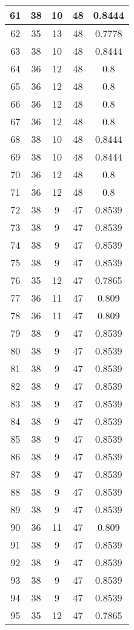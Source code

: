 \documentclass[letterpaper, 12pt]{article}
\begin{document}
\begin{longtable}{|c|c|c|c|c|}
\hline
61 & 38 & 10 & 48 & 0.8444 \\
\hline
62 & 35 & 13 & 48 & 0.7778 \\
\hline
63 & 38 & 10 & 48 & 0.8444 \\
\hline
64 & 36 & 12 & 48 & 0.8 \\
\hline
65 & 36 & 12 & 48 & 0.8 \\
\hline
66 & 36 & 12 & 48 & 0.8 \\
\hline
67 & 36 & 12 & 48 & 0.8 \\
\hline
68 & 38 & 10 & 48 & 0.8444 \\
\hline
69 & 38 & 10 & 48 & 0.8444 \\
\hline
70 & 36 & 12 & 48 & 0.8 \\
\hline
71 & 36 & 12 & 48 & 0.8 \\
\hline
72 & 38 & 9 & 47 & 0.8539 \\
\hline
73 & 38 & 9 & 47 & 0.8539 \\
\hline
74 & 38 & 9 & 47 & 0.8539 \\
\hline
75 & 38 & 9 & 47 & 0.8539 \\
\hline
76 & 35 & 12 & 47 & 0.7865 \\
\hline
77 & 36 & 11 & 47 & 0.809 \\
\hline
78 & 36 & 11 & 47 & 0.809 \\
\hline
79 & 38 & 9 & 47 & 0.8539 \\
\hline
80 & 38 & 9 & 47 & 0.8539 \\
\hline
81 & 38 & 9 & 47 & 0.8539 \\
\hline
82 & 38 & 9 & 47 & 0.8539 \\
\hline
83 & 38 & 9 & 47 & 0.8539 \\
\hline
84 & 38 & 9 & 47 & 0.8539 \\
\hline
85 & 38 & 9 & 47 & 0.8539 \\
\hline
86 & 38 & 9 & 47 & 0.8539 \\
\hline
87 & 38 & 9 & 47 & 0.8539 \\
\hline
88 & 38 & 9 & 47 & 0.8539 \\
\hline
89 & 38 & 9 & 47 & 0.8539 \\
\hline
90 & 36 & 11 & 47 & 0.809 \\
\hline
91 & 38 & 9 & 47 & 0.8539 \\
\hline
92 & 38 & 9 & 47 & 0.8539 \\
\hline
93 & 38 & 9 & 47 & 0.8539 \\
\hline
94 & 38 & 9 & 47 & 0.8539 \\
\hline
95 & 35 & 12 & 47 & 0.7865 \\

\end{longtable}
\end{document}
